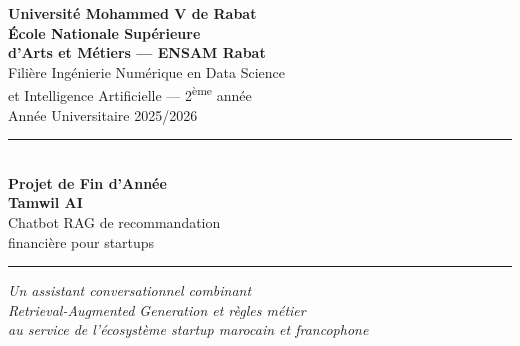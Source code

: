 \begin{titlepage}
    \centering

    \begin{minipage}[c]{0.28\textwidth}
        \centering \logoUM
    \end{minipage}\hfill
    \begin{minipage}[c]{0.40\textwidth}
        \centering
        {\small\textbf{Université Mohammed V de Rabat}}\\[0.15cm]
        {\small\textbf{École Nationale Supérieure}}\\
        {\small\textbf{d'Arts et Métiers — ENSAM Rabat}}\\[0.15cm]
        {\footnotesize Filière Ingénierie Numérique en Data Science}\\
        {\footnotesize et Intelligence Artificielle — 2\textsuperscript{ème} année}\\[0.15cm]
        {\footnotesize Année Universitaire 2025/2026}
    \end{minipage}\hfill
    \begin{minipage}[c]{0.28\textwidth}
        \centering \logoENSAM
    \end{minipage}

    \vspace{1.8cm}

    \rule{\textwidth}{1.5pt}\\[0.4cm]
    {\LARGE\textbf{Projet de Fin d'Année}}\\[0.8cm]
    {\Huge\textbf{Tamwil AI}}\\[0.4cm]
    {\Large Chatbot RAG de recommandation\\[0.2cm] financière pour startups}\\[0.4cm]
    \rule{\textwidth}{1.5pt}

    \vspace{1.2cm}
    {\normalsize\itshape Un assistant conversationnel combinant\\[0.1cm]
     Retrieval-Augmented Generation et règles métier\\[0.1cm]
     au service de l'écosystème startup marocain et francophone}

    \vspace{2cm}


\end{titlepage}
